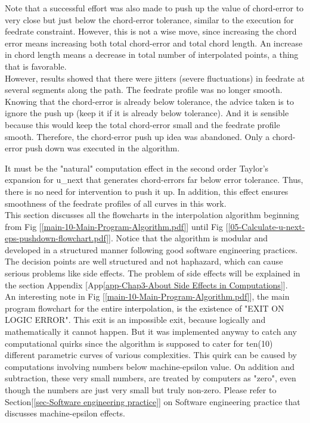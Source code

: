 Note that a successful effort was also made to push up the value of chord-error to very close but just below the chord-error tolerance, similar to the execution for feedrate constraint. However, this is not a wise move, since increasing the chord error means increasing both total chord-error and total chord length. An increase in chord length means a decrease in total number of interpolated points, a thing that is favorable.\\

However, results showed that there were jitters (severe fluctuations) in feedrate at several segments along the path. The feedrate profile was no longer smooth. Knowing that the chord-error is already below tolerance, the advice taken is to ignore the push up (keep it if it is already below tolerance). And it is sensible because this would keep the total chord-error small and the feedrate profile smooth. Therefore, the chord-error push up idea was abandoned. Only a chord-error push down was executed in the algorithm. 

\clearpage
\pagebreak

It must be the "natural" computation effect in the second order Taylor's expansion for u\_next that generates chord-errors far below error tolerance. Thus, there is no need for intervention to push it up. In addition, this effect ensures smoothness of the feedrate profiles of all curves in this work.\\   
 
This section discusses all the flowcharts in the interpolation algorithm beginning from Fig [\ref{main-10-Main-Program-Algorithm.pdf}] until Fig [\ref{05-Calculate-u-next-eps-pushdown-flowchart.pdf}]. Notice that the algorithm is modular and developed in a structured manner following good software engineering practices. The decision points are well structured and not haphazard, which can cause serious problems like side effects. The problem of side effects will be explained in the section Appendix [App\ref{app-Chap3-About Side Effects in Computations}].  \\

An interesting note in Fig [\ref{main-10-Main-Program-Algorithm.pdf}], the main program flowchart for the entire interpolation, is the existence of "EXIT ON LOGIC ERROR". This exit is an impossible exit, because logically and mathematically it cannot happen. But it was implemented anyway to catch any computational quirks since the algorithm is supposed to cater for ten(10) different parametric curves of various complexities. This quirk can be caused by computations involving numbers below machine-epsilon value. On addition and subtraction, these very small numbers, are treated by computers as "zero", even though the numbers are just very small but truly non-zero. Please refer to Section[\ref{sec-Software engineering practice}] on Software engineering practice that discusses machine-epsilon effects.\\

